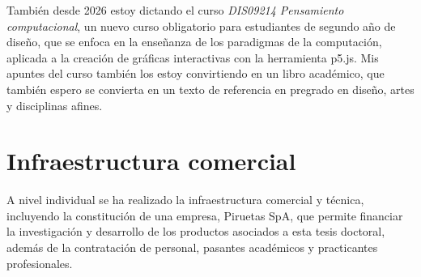 \documentclass[../proyecto.tex]{subfiles}
\begin{document}
También desde 2026 estoy dictando el curso \textit{DIS09214 Pensamiento computacional}, un nuevo curso obligatorio para estudiantes de segundo año de diseño, que se enfoca en la enseñanza de los paradigmas de la computación, aplicada a la creación de gráficas interactivas con la herramienta p5.js. Mis apuntes del curso también los estoy convirtiendo en un libro académico, que también espero se convierta en un texto de referencia en pregrado en diseño, artes y disciplinas afines.

\section{Infraestructura comercial}

A nivel individual se ha realizado la infraestructura comercial y técnica, incluyendo la constitución de una empresa, Piruetas SpA, que permite financiar la investigación y desarrollo de los productos asociados a esta tesis doctoral, además de la contratación de personal, pasantes académicos y practicantes profesionales.
\end{document}
